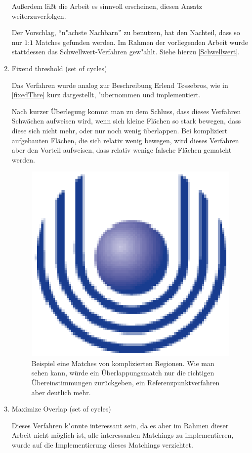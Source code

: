 \begin{enumerate}
Außerdem läßt die Arbeit \cite{AFRW} es sinnvoll erscheinen, diesen Ansatz weiterzuverfolgen.

Der Vorschlag, "`n"achste Nachbarn"' zu benutzen, hat den Nachteil, dass so nur $1$:$1$ Matches gefunden werden. Im Rahmen der vorliegenden Arbeit wurde stattdessen das Schwellwert-Verfahren gew"ahlt. Siehe hierzu \vref{Schwellwert}.

\item Fixend threshold (set of cycles)

Das Verfahren wurde analog zur Beschreibung Erlend T\o{}ssebros, wie in \vref{fixedThre} kurz dargestellt, "ubernommen und implementiert. 

Nach kurzer Überlegung kommt man zu dem Schluss, dass dieses Verfahren Schwächen aufweisen wird, wenn sich kleine Flächen so stark bewegen, dass diese sich nicht mehr, oder nur noch wenig überlappen. Bei kompliziert aufgebauten Flächen, die sich relativ wenig bewegen, wird dieses Verfahren aber den Vorteil aufweisen, dass relativ wenige falsche Flächen gematcht werden.

\begin{figure}
	\centering
	\includegraphics{feu_logo2.eps}
	\caption[Beispiel für den Vorteil des Overlaping-Match]{Beispiel eine Matches von komplizierten Regionen. Wie man sehen kann, würde ein Überlappungsmatch nur die richtigen Übereinstimmungen zurückgeben, ein Referenzpunktverfahren aber deutlich mehr.}
	\label{fig:OverlapVorteil}
\end{figure}


\item Maximize Overlap (set of cycles)

Dieses Verfahren k"onnte interessant sein, da es aber im  Rahmen dieser Arbeit nicht möglich ist, alle interessanten Matchings zu implementieren, wurde auf die Implementierung dieses Matchings verzichtet.

\end{enumerate}

